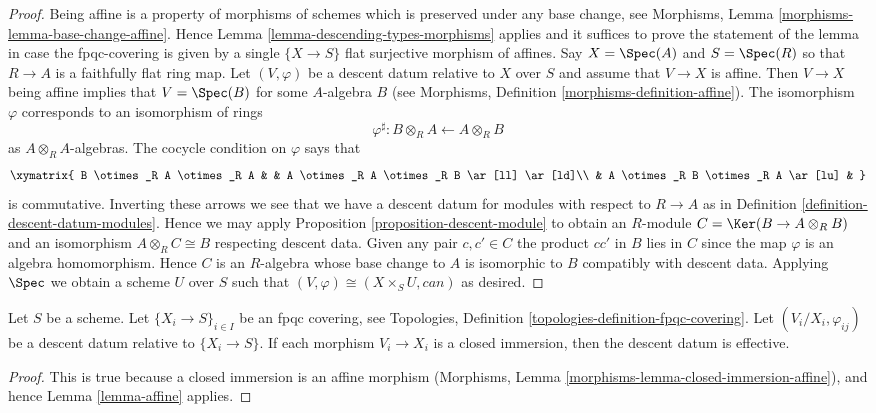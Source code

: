 \begin{proof}
Being affine is a property of morphisms of schemes
which is preserved under any base change, see
Morphisms, Lemma \ref{morphisms-lemma-base-change-affine}.
Hence Lemma \ref{lemma-descending-types-morphisms} applies
and it suffices to prove the statement of the lemma
in case the fpqc-covering is given by a single
$\{X \to S\}$ flat surjective morphism of affines.
Say $X = \Spec(A)$ and $S = \Spec(R)$ so
that $R \to A$ is a faithfully flat ring map.
Let $(V, \varphi)$ be a descent datum relative to $X$ over $S$
and assume that $V \to X$ is affine.
Then $V \to X$ being affine implies that $V = \Spec(B)$
for some $A$-algebra $B$ (see
Morphisms, Definition \ref{morphisms-definition-affine}).
The isomorphism $\varphi$ corresponds to an isomorphism
of rings
$$
\varphi^\sharp :
B \otimes_R A \longleftarrow A \otimes_R B
$$
as $A \otimes_R A$-algebras. The cocycle condition on $\varphi$
says that
$$
\xymatrix{
B \otimes_R A \otimes_R A & &
A \otimes_R A \otimes_R B \ar[ll] \ar[ld]\\
& A \otimes_R B \otimes_R A \ar[lu] &
}
$$
is commutative. Inverting these arrows we see that we have a
descent datum for modules with respect to $R \to A$ as in
Definition \ref{definition-descent-datum-modules}.
Hence we may apply Proposition \ref{proposition-descent-module}
to obtain an $R$-module
$C = \Ker(B \to A \otimes_R B)$
and an isomorphism $A \otimes_R C \cong B$
respecting descent data. Given any pair $c, c' \in C$
the product $cc'$ in $B$ lies in $C$ since the
map $\varphi$ is an algebra homomorphism. Hence
$C$ is an $R$-algebra whose base change to $A$ is
isomorphic to $B$ compatibly with descent data.
Applying $\Spec$ we obtain a scheme
$U$ over $S$ such that $(V, \varphi) \cong (X \times_S U, can)$
as desired.
\end{proof}

\begin{lemma}
\label{lemma-closed-immersion}
Let $S$ be a scheme.
Let $\{X_i \to S\}_{i\in I}$ be an fpqc covering, see
Topologies, Definition \ref{topologies-definition-fpqc-covering}.
Let $(V_i/X_i, \varphi_{ij})$ be a descent datum
relative to $\{X_i \to S\}$. If each morphism
$V_i \to X_i$ is a closed immersion, then the descent datum is
effective.
\end{lemma}

\begin{proof}
This is true because a closed immersion is an affine morphism
(Morphisms, Lemma \ref{morphisms-lemma-closed-immersion-affine}),
and hence Lemma \ref{lemma-affine} applies.
\end{proof}


